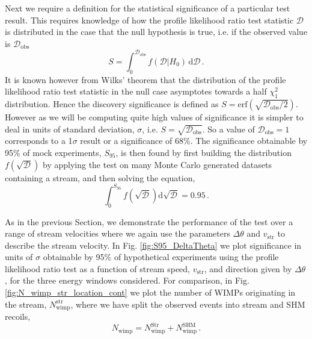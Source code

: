 Next we require a definition for the statistical significance of a particular test result. This requires knowledge of how the profile likelihood ratio test statistic $\mathcal{D}$ is distributed in the case that the null hypothesis is true, i.e. if the observed value is $\mathcal{D}_\textrm{obs}$
\begin{equation}
	S = \int_0^{\mathcal{D}_\textrm{obs}} f(\mathcal{D} | H_0) \, \textrm{d}\mathcal{D} \,.
\end{equation}
It is known however from Wilks' theorem \cite{Cowan:2010js} that the distribution of the profile likelihood ratio test statistic in the null case asymptotes towards a half $\chi_1^2$ distribution. Hence the discovery significance is defined as $S = \textrm{erf}\left(\sqrt{\mathcal{D}_\textrm{obs}/2}\right)$. However as we will be computing quite high values of significance it is simpler to deal in units of standard deviation, $\sigma$, i.e. $S = \sqrt{\mathcal{D}_\textrm{obs}}$. So a value of $\mathcal{D}_\textrm{obs} = 1$ corresponds to a 1$\sigma$ result or a significance of 68\%. The significance obtainable by 95\% of mock experiments, $S_{95}$, is then found by first building the distribution $f(\sqrt{\mathcal{D}})$ by applying the test on many Monte Carlo generated datasets containing a stream, and then solving the equation,
\begin{equation}
\int_0^{S_{95}} f(\sqrt{\mathcal{D}})\textrm{d}\sqrt{\mathcal{D}} = 0.95 \, .
\end{equation}

As in the previous Section, we demonstrate the performance of the test over a range of stream velocities where we again use the parameters $\Delta \theta$ and $v_\textrm{str}$ to describe the stream velocity. In Fig. \ref{fig:S95_DeltaTheta} we plot significance in units of $\sigma$ obtainable by 95\% of hypothetical experiments using the profile likelihood ratio test as a function of stream speed, $v_\textrm{str}$, and direction given by $\Delta \theta$, for the three energy windows considered. For comparison, in Fig. \ref{fig:N_wimp_str_location_cont} we plot the number of WIMPs originating in the stream, $N_\textrm{wimp}^\textrm{str}$, where we have split the observed events into stream and SHM recoils,
\begin{equation}
  N_\textrm{wimp} = N_\textrm{wimp}^\textrm{Str} + N_\textrm{wimp}^\textrm{SHM} \, .
\end{equation}

